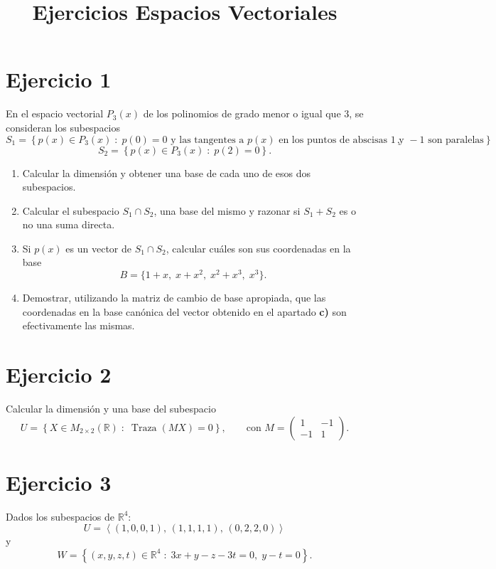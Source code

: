 \documentclass[12pt]{article}
\title{Ejercicios Espacios Vectoriales}
\author{}
\begin{document}
\maketitle
\section*{Ejercicio 1}

En el espacio vectorial \(P_3(x)\) de los polinomios de grado menor o igual que \(3\), se consideran los subespacios
\[
S_1=\left\{p(x)\in P_3(x)\;:\; p(0)=0 \text{ y las tangentes a } p(x) \text{ en los puntos de abscisas } 1 \text{ y } -1 \text{ son paralelas}\right\},
\]
\[
S_2=\left\{p(x)\in P_3(x)\;:\; p(2)=0\right\}.
\]

\begin{enumerate}
    \item Calcular la dimensión y obtener una base de cada uno de esos dos subespacios.
    \item Calcular el subespacio \(S_1\cap S_2\), una base del mismo y razonar si \(S_1+S_2\) es o no una suma directa.
    \item Si \(p(x)\) es un vector de \(S_1\cap S_2\), calcular cuáles son sus coordenadas en la base
    \[
    B=\{1+x,\;x+x^2,\;x^2+x^3,\;x^3\}.
    \]
    \item Demostrar, utilizando la matriz de cambio de base apropiada, que las coordenadas en la base canónica del vector obtenido en el apartado \textbf{c)} son efectivamente las mismas.
\end{enumerate}

\section*{Ejercicio 2}

Calcular la dimensión y una base del subespacio
\[
U=\left\{X\in M_{2\times 2}(\mathbb{R}) \;:\; \operatorname{Traza}(MX)=0\right\},
\qquad
\text{con }
M=
\begin{pmatrix}
1 & -1\\
-1 & 1
\end{pmatrix}.
\]


\section*{Ejercicio 3}

Dados los subespacios de \(\mathbb{R}^4\):
\[
U=\left\langle (1,0,0,1),\,(1,1,1,1),\,(0,2,2,0)\right\rangle
\]
y
\[
W=\left\{(x,y,z,t)\in\mathbb{R}^4 \;:\; 3x+y-z-3t=0,\; y-t=0\right\}.
\]
\end{document}
